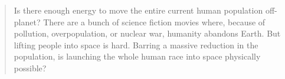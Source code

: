 \begin{abstract}

Is there enough energy to move the entire current human population off-planet?
%
There are a bunch of science fiction movies where, because of pollution,
overpopulation, or nuclear war, humanity abandons Earth.
%
But lifting people into space is hard.
Barring a massive reduction in the population,
is launching the whole human race into space physically possible?

\end{abstract}
